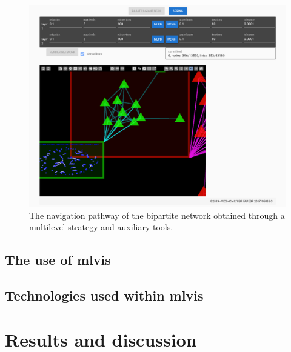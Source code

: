 \documentclass[runningheads]{llncs}
\begin{document}
\begin{figure}[!h]\centering
 \includegraphics[width=\textwidth]{fpage}
  \caption{The navigation pathway of the bipartite network obtained through a multilevel strategy
  and auxiliary tools.
  }\label{fpage}
\end{figure}

\subsection{The use of mlvis}

\subsection{Technologies used within mlvis}

\section{Results and discussion}\label{res}

\end{document}
